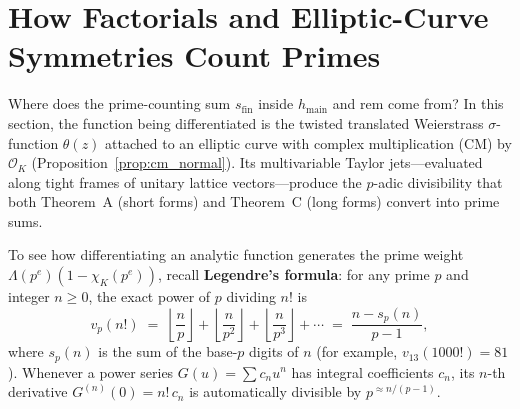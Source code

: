 \documentclass[11pt]{amsart}
\newcommand{\OK}{\mathcal{O}_K}
\newcommand{\sfin}{s_{\mathrm{fin}}}
\newcommand{\hmain}{h_{\mathrm{main}}}
\newcommand{\rem}{\mathrm{rem}}
\theoremstyle{definition}
\theoremstyle{remark}
\begin{document}
\section{How Factorials and Elliptic-Curve Symmetries Count Primes}\label{sec:cm}

Where does the prime-counting sum $\sfin$ inside $\hmain$ and $\rem$ come from? In this section, the function being differentiated is the twisted translated Weierstrass $\sigma$-function $\theta(z)$ attached to an elliptic curve with complex multiplication (CM) by $\OK$ (Proposition~\ref{prop:cm_normal}). Its multivariable Taylor jets---evaluated along tight frames of unitary lattice vectors---produce the $p$-adic divisibility that both Theorem~A (short forms) and Theorem~C (long forms) convert into prime sums.

To see how differentiating an analytic function generates the prime weight $\Lambda(p^e)(1-\chi_K(p^e))$, recall \textbf{Legendre's formula}: for any prime $p$ and integer $n\ge 0$, the exact power of $p$ dividing $n!$ is
\[
 v_p(n!) \;=\; \left\lfloor\frac{n}{p}\right\rfloor + \left\lfloor\frac{n}{p^2}\right\rfloor + \left\lfloor\frac{n}{p^3}\right\rfloor + \cdots \;=\; \frac{n - s_p(n)}{p-1},
\]
where $s_p(n)$ is the sum of the base-$p$ digits of $n$ (for example, $v_{13}(1000!)=81$). Whenever a power series $G(u)=\sum c_n u^n$ has integral coefficients $c_n$, its $n$-th derivative $G^{(n)}(0)=n!\,c_n$ is automatically divisible by $p^{\approx n/(p-1)}$.
\end{document}

